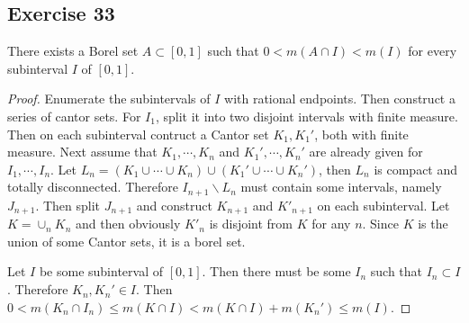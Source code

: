 \subsection*{Exercise 33}
There exists a Borel set $A\subset[0,1]$ such that $0<m(A\cap I)<m(I)$ for every subinterval $I$ of $[0,1]$.
\begin{proof}
    Enumerate the subintervals of $I$ with rational endpoints. Then construct a series of cantor sets. For $I_1$, split it into two disjoint intervals with finite measure. Then on each subinterval contruct a Cantor set $K_1,K_1'$, both with finite measure. Next assume that $K_1,\cdots,K_n$ and $K_1',\cdots,K_n'$ are already given for $I_1,\cdots,I_n$. Let $L_n=(K_1\cup\cdots\cup K_n)\cup(K_1'\cup\cdots\cup K_n')$, then $L_n$ is compact and totally disconnected. Therefore $I_{n+1}\backslash L_n$ must contain some intervals, namely $J_{n+1}$. Then split $J_{n+1}$ and construct $K_{n+1}$ and $K'_{n+1}$ on each subinterval. Let $K=\cup_n K_n$ and then obviously $K'_n$ is disjoint from $K$ for any $n$. Since $K$ is the union of some Cantor sets, it is a borel set.
    \par Let $I$ be some subinterval of $[0,1]$. Then there must be some $I_n$ such that $I_n\subset I$. Therefore $K_n,K_n'\in I$. Then $0<m(K_n\cap I_n)\le m(K\cap I)<m(K\cap I)+m(K_n')\le m(I)$.
\end{proof}